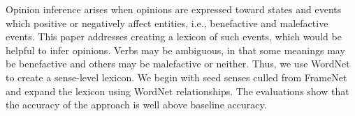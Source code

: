 Opinion inference arises when opinions are expressed toward states and events which positive or negatively affect entities, i.e., benefactive and malefactive events. This paper addresses creating a lexicon of such events, which would be helpful to infer opinions. Verbs may be ambiguous, in that some meanings may be benefactive and others may be malefactive or neither. Thus, we use WordNet to create a sense-level lexicon. We begin with seed senses culled from FrameNet and expand the lexicon using WordNet relationships. The evaluations show that the accuracy of the approach is well above baseline accuracy.
